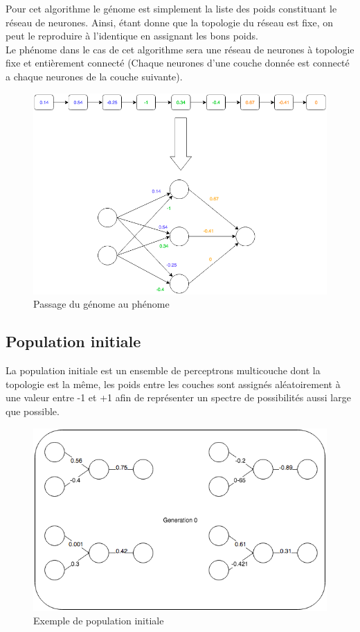 \documentclass{article}
\begin{document}
Pour cet algorithme le génome est simplement la liste des poids constituant le réseau de neurones. Ainsi, étant donne que la topologie du réseau est fixe, on peut le reproduire à l'identique en assignant les bons poids.\\

Le phénome dans le cas de cet algorithme sera une réseau de neurones à topologie fixe et entièrement connecté (Chaque neurones d'une couche donnée est connecté a chaque neurones de la couche suivante).

\begin{figure}[h]
\begin{center}
	\includegraphics[scale=0.5]{genomephenome.png}
	\caption{Passage du génome au phénome}
\end{center}
\end{figure}

\subsection{Population initiale}

La population initiale est un ensemble de perceptrons multicouche dont la topologie est la même, les poids entre les couches sont assignés aléatoirement à une valeur entre -1 et +1 afin de représenter un spectre de possibilités aussi large que possible.
\begin{figure}[h]
\begin{center}
	\includegraphics[scale=0.6]{gen0mlp.png} 
	\caption{Exemple de population initiale}
\end{center}
\end{figure}
\end{document}

